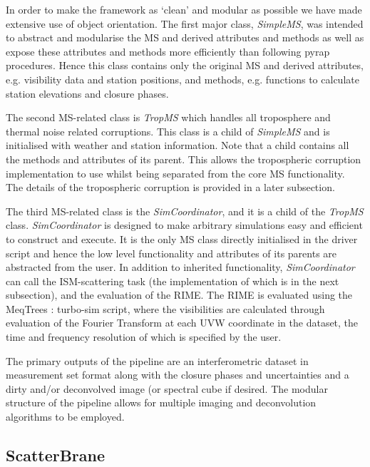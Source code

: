 In order to make the framework as `clean' and  modular as possible we have made extensive use of object orientation. The first major class, \emph{SimpleMS}, was intended to abstract and modularise the MS and derived attributes and methods as well as expose these attributes and methods more efficiently than following {\sc pyrap} procedures. Hence this class contains only the original MS and derived attributes, e.g. visibility data and station positions, and methods, e.g. functions to calculate station elevations and closure phases.


The second MS-related class is \emph{TropMS} which handles all troposphere and thermal noise related corruptions. This class is a child of {\it SimpleMS} and is initialised with weather and station information. Note that a child contains all the methods and attributes of its parent. This allows the tropospheric corruption implementation to use whilst being separated from the core MS functionality. The details of the tropospheric corruption is provided in a later subsection.


The third MS-related class is the \emph{SimCoordinator}, and it is a child of the {\it TropMS} class. {\it SimCoordinator} is designed to make arbitrary simulations easy and efficient to construct and execute. It is the only MS class directly initialised in the driver script and hence the low level functionality and attributes of its parents are abstracted from the user. In addition to inherited functionality, {\it SimCoordinator} can call the ISM-scattering task (the implementation of which is in the next subsection), and the evaluation of the RIME. The RIME is evaluated using the MeqTrees : turbo-sim script, where the visibilities are calculated through evaluation of the Fourier Transform at each UVW coordinate in the dataset, the time and frequency resolution of which is specified by the user.
 
 
 

The primary outputs of the pipeline are an interferometric dataset in {\sc measurement set} format along with the closure phases and uncertainties and a dirty and/or deconvolved image (or spectral cube if desired. The modular structure of the pipeline allows for multiple imaging and deconvolution algorithms to be employed. 



\subsection{ScatterBrane}




